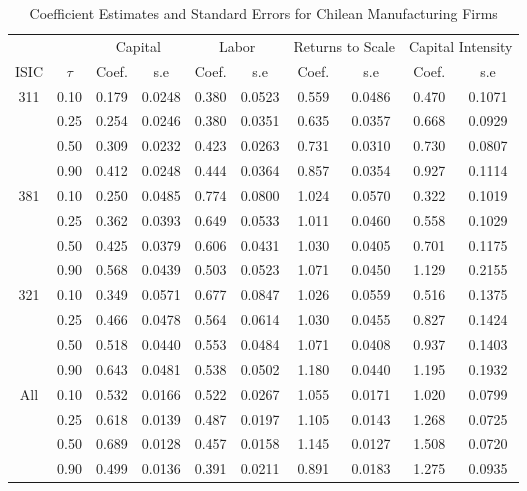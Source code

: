 \begin{table}[ht]
\centering
\caption{Coefficient Estimates and Standard Errors for Chilean Manufacturing Firms} 
\begin{tabular}{cccccccccc}
  \hline\hline & & \multicolumn{2}{c}{Capital}  & \multicolumn{2}{c}{Labor} & \multicolumn{2}{c}{Returns to Scale} & \multicolumn{2}{c}{Capital Intensity}\\ \cmidrule(lr){3-4} \cmidrule(lr){5-6} \cmidrule(lr){7-8} \cmidrule(lr){9-10}ISIC & $\tau$ & Coef. & s.e & Coef. & s.e & Coef. & s.e & Coef. & s.e \\ 
  \hline
311 & 0.10 & 0.179 & 0.0248 & 0.380 & 0.0523 & 0.559 & 0.0486 & 0.470 & 0.1071 \\ 
   & 0.25 & 0.254 & 0.0246 & 0.380 & 0.0351 & 0.635 & 0.0357 & 0.668 & 0.0929 \\ 
   & 0.50 & 0.309 & 0.0232 & 0.423 & 0.0263 & 0.731 & 0.0310 & 0.730 & 0.0807 \\ 
   & 0.90 & 0.412 & 0.0248 & 0.444 & 0.0364 & 0.857 & 0.0354 & 0.927 & 0.1114 \\ 
  381 & 0.10 & 0.250 & 0.0485 & 0.774 & 0.0800 & 1.024 & 0.0570 & 0.322 & 0.1019 \\ 
   & 0.25 & 0.362 & 0.0393 & 0.649 & 0.0533 & 1.011 & 0.0460 & 0.558 & 0.1029 \\ 
   & 0.50 & 0.425 & 0.0379 & 0.606 & 0.0431 & 1.030 & 0.0405 & 0.701 & 0.1175 \\ 
   & 0.90 & 0.568 & 0.0439 & 0.503 & 0.0523 & 1.071 & 0.0450 & 1.129 & 0.2155 \\ 
  321 & 0.10 & 0.349 & 0.0571 & 0.677 & 0.0847 & 1.026 & 0.0559 & 0.516 & 0.1375 \\ 
   & 0.25 & 0.466 & 0.0478 & 0.564 & 0.0614 & 1.030 & 0.0455 & 0.827 & 0.1424 \\ 
   & 0.50 & 0.518 & 0.0440 & 0.553 & 0.0484 & 1.071 & 0.0408 & 0.937 & 0.1403 \\ 
   & 0.90 & 0.643 & 0.0481 & 0.538 & 0.0502 & 1.180 & 0.0440 & 1.195 & 0.1932 \\ 
  All & 0.10 & 0.532 & 0.0166 & 0.522 & 0.0267 & 1.055 & 0.0171 & 1.020 & 0.0799 \\ 
   & 0.25 & 0.618 & 0.0139 & 0.487 & 0.0197 & 1.105 & 0.0143 & 1.268 & 0.0725 \\ 
   & 0.50 & 0.689 & 0.0128 & 0.457 & 0.0158 & 1.145 & 0.0127 & 1.508 & 0.0720 \\ 
   & 0.90 & 0.499 & 0.0136 & 0.391 & 0.0211 & 0.891 & 0.0183 & 1.275 & 0.0935 \\ 
   \hline
\end{tabular}
\end{table}
